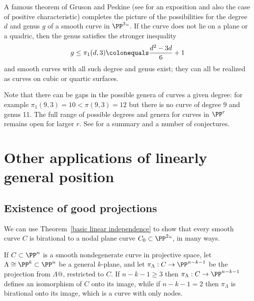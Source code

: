 \begin{fact}
A famous theorem of Gruson and Peskine \citeyear{MR0690647} (see
%
%
\cite{MR0689536} for an exposition and also the case of
positive
characteristic) completes the picture of the
possibilities for the degree $d$ and  genus $g$  of a smooth curve in
$\PP^3` `$. If the curve does not lie on a plane or a quadric, then the
genus satisfies the stronger inequality
$$
g\leq
\pi_1(d,3)
\colonequals  \frac{d^2-3d}{6} +1
$$
and smooth curves with all such degree and genus exist; they can all be
%
realized as curves
on cubic or quartic surfaces.

Note that there can be gaps in the possible genera of curves a given
degree: for example  $\pi_1(9,3) = 10<\pi(9,3) =12$ but there is
no curve of degree 9 and genus 11.
The full range of possible degrees and genera for curves in $\PP^r$
remains open for larger $r$.
See
\cite{MR0589222} for a summary and a number of
conjectures.
\end{fact}


\section{Other applications of linearly general position}
\label{projection section}\label{good projections}

\subsection*{Existence of good projections}

We can use Theorem~\ref{basic linear independence} to show that every
%
smooth curve $C$ is
birational
%
%
to a
nodal plane curve
$C_0 \subset \PP^2``$, in many ways.

\begin{proposition}\label{nodal projection}
If $C \subset \PP^n$ is a smooth nondegenerate curve in projective space,
let $\Lambda \cong \PP^{k} \subset \PP^n$ be a general $k$-plane, and let
$\pi_\Lambda : C \to \PP^{n-k-1}$ be the projection from $\Lambda@$,
restricted to $C$. If  $n-k-1 \geq 3$
then
$\pi_\Lambda: C \to \PP^{n-k-1}$ defines an isomorphism of $C$ onto
its image, while if $n-k-1 = 2$ then $\pi_\Lambda$
is birational onto its image, which is a curve with only nodes.
\end{proposition}

